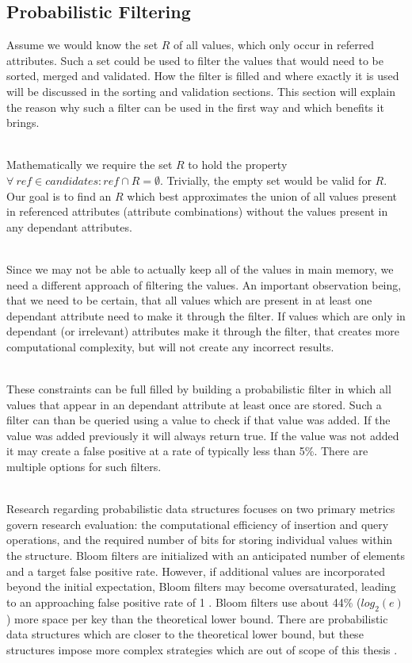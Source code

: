 \subsection{Probabilistic Filtering}
Assume we would know the set $R$ of all values, which only occur in referred attributes. Such a set could be used to filter the values that would need to be sorted, merged and validated. How the filter is filled and where exactly it is used will be discussed in the sorting and validation sections. This section will explain the reason why such a filter can be used in the first way and which benefits it brings.

\noindent \\ Mathematically we require the set $R$ to hold the property $\forall \: ref \in candidates : ref \cap R = \emptyset$. Trivially, the empty set would be valid for $R$. Our goal is to find an $R$ which best approximates the union of all values present in referenced attributes (attribute combinations) without the values present in any dependant attributes.

\noindent \\ Since we may not be able to actually keep all of the values in main memory, we need a different approach of filtering the values. An important observation being, that we need to be certain, that all values which are present in at least one dependant attribute need to make it through the filter. If values which are only in dependant (or irrelevant) attributes make it through the filter, that creates more computational complexity, but will not create any incorrect results.

\noindent \\ These constraints can be full filled by building a probabilistic filter in which all values that appear in an dependant attribute at least once are stored. Such a filter can than be queried using a value to check if that value was added. If the value was added previously it will always return true. If the value was not added it may create a false positive at a rate of typically less than 5\%. There are multiple options for such filters.

\noindent \\ Research regarding probabilistic data structures focuses on two primary metrics govern research evaluation: the computational efficiency of insertion and query operations, and the required number of bits for storing individual values within the structure\cite{fan2014cuckoo}. Bloom filters are initialized with an anticipated number of elements and a target false positive rate. However, if additional values are incorporated beyond the initial expectation, Bloom filters may become oversaturated, leading to an approaching false positive rate of 1 \cite{tarkoma2011theory}. Bloom filters use about 44\% ($log_2(e)$) more space per key than the theoretical lower bound. There are probabilistic data structures which are closer to the theoretical lower bound, but these structures impose more complex strategies which are out of scope of this thesis \cite{fan2014cuckoo}.

